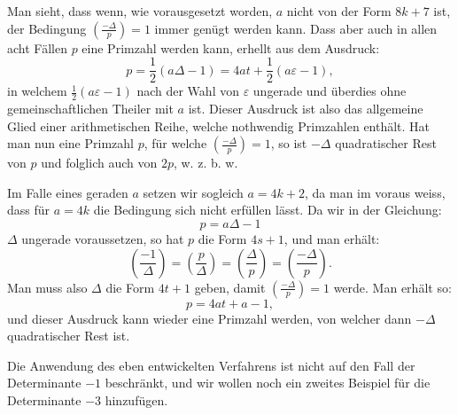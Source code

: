 \documentclass[11pt]{article}
\newcommand{\leg}[2]{\left(\frac{#1}{#2}\right)}
\begin{document}
Man sieht, dass wenn, wie vorausgesetzt worden, $a$ nicht von der Form $8k+7$ ist, der Bedingung $\leg{-\Delta}{p}=1$ immer genügt werden kann. Dass aber auch in allen acht Fällen $p$ eine Primzahl werden kann, erhellt aus dem Ausdruck:
\[
 p=\frac12(a\Delta-1)=4at+\frac12(a\varepsilon-1),
\]
in welchem $\frac12(a\varepsilon-1)$ nach der Wahl von $\varepsilon$ ungerade und überdies ohne gemeinschaftlichen Theiler mit $a$ ist. Dieser Ausdruck ist also das allgemeine Glied einer arithmetischen Reihe, welche nothwendig Primzahlen enthält. Hat man nun eine Primzahl $p$, für welche $\leg{-\Delta}{p}=1$, so ist $-\Delta$ quadratischer Rest von $p$ und folglich auch von $2p$, w. z. b. w.

Im Falle eines geraden $a$ setzen wir sogleich $a=4k+2$, da man im voraus weiss, dass für $a=4k$ die Bedingung sich nicht erfüllen lässt. Da wir in der Gleichung:
\[
 p=a\Delta-1
\]
$\Delta$ ungerade voraussetzen, so hat $p$ die Form $4s+1$, und man erhält:
\[
 \leg{-1}{\Delta}=\leg{p}{\Delta}=\leg{\Delta}{p}=\leg{-\Delta}{p}.
\]
Man muss also $\Delta$ die Form $4t+1$ geben, damit $\leg{-\Delta}{p}=1$ werde. Man erhält so:
\[
 p=4at+a-1,
\]
und dieser Ausdruck kann wieder eine Primzahl werden, von welcher dann $-\Delta$ quadratischer Rest ist.

Die Anwendung des eben entwickelten Verfahrens ist nicht auf den Fall der Determinante $-1$ beschränkt, und wir wollen noch ein zweites Beispiel für die Determinante $-3$ hinzufügen.
\end{document}

